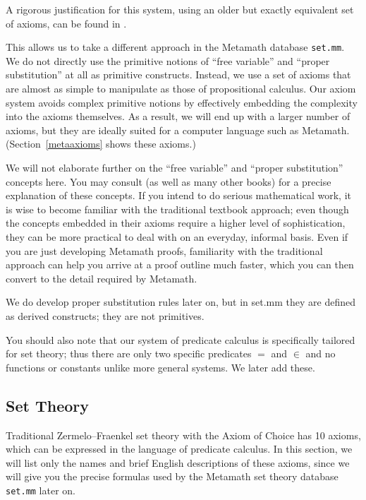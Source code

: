A rigorous justification for this system, using an older but
exactly equivalent set of axioms, can be
found in \cite{Megill}.

This allows us to
take a different approach in the Metamath database
\texttt{set.mm}.  We do not
directly use the primitive notions of ``free variable''
and ``proper substitution'' at all as primitive constructs.
Instead, we use a set
of axioms that are almost as simple to manipulate as those of
propositional calculus.  Our axiom system avoids complex primitive
notions by effectively embedding the complexity into the axioms
themselves.  As a result, we will end up with a larger number of axioms,
but they are ideally suited for a computer language such as Metamath.
(Section~\ref{metaaxioms} shows these axioms.)

We will not elaborate further
on the ``free variable'' and ``proper substitution''
concepts here.  You may consult
\cite[ch.\ 3--4]{Hamilton} (as well as
many other books) for a precise explanation
of these concepts.  If you intend to do serious mathematical work, it is wise
to become familiar with the traditional textbook approach; even though the
concepts embedded in their axioms require a higher level of sophistication,
they can be more practical to deal with on an everyday, informal basis.  Even
if you are just developing Metamath proofs, familiarity with the traditional
approach can help you arrive at a proof outline much faster, which you can
then convert to the detail required by Metamath.

We do develop proper substitution rules later on, but in set.mm
they are defined as derived constructs; they are not primitives.

You should also note that our system of predicate calculus is specifically
tailored for set theory; thus there are only two specific predicates $=$ and
$\in$ and no functions
or constants unlike more general systems.
We later add these.

\subsection{Set Theory}

Traditional Zermelo--Fraenkel set theory with the Axiom of Choice
has 10 axioms, which can be expressed in the
language of predicate calculus.  In this section, we will list only the
names and brief English descriptions of these axioms, since we will give
you the precise formulas used by the Metamath set theory
database \texttt{set.mm} later on.

